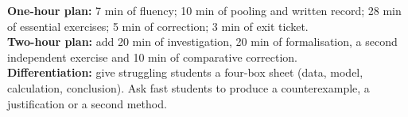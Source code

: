 \ifmxteacher
\begin{method}
\textbf{One-hour plan:} 7 min of fluency; 10 min of pooling and written record; 28 min of essential exercises; 5 min of correction; 3 min of exit ticket.\\
\textbf{Two-hour plan:} add 20 min of investigation, 20 min of formalisation, a second independent exercise and 10 min of comparative correction.\\
\textbf{Differentiation:} give struggling students a four-box sheet (data, model, calculation, conclusion). Ask fast students to produce a counterexample, a justification or a second method.
\end{method}
\fi
